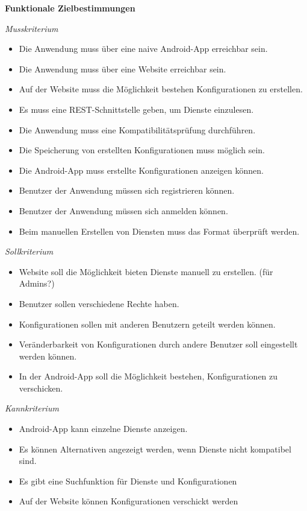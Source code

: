 
\textbf{Funktionale Zielbestimmungen}\newline

\textit{Musskriterium}

\begin{itemize}[leftmargin=4pc]
	\item Die Anwendung muss über eine naive Android-App erreichbar sein.
	\item Die Anwendung muss über eine Website erreichbar sein.
	\item Auf der Website muss die Möglichkeit bestehen Konfigurationen zu erstellen.
	\item Es muss eine REST-Schnittstelle geben, um Dienste einzulesen.
	\item Die Anwendung muss eine Kompatibilitätsprüfung durchführen.
	\item Die Speicherung von erstellten Konfigurationen muss möglich sein.
	\item Die Android-App muss erstellte Konfigurationen anzeigen können.
	\item Benutzer der Anwendung müssen sich registrieren können.
	\item Benutzer der Anwendung müssen sich anmelden können.
	\item Beim manuellen Erstellen von Diensten muss das Format überprüft werden.
\end{itemize}

\textit{Sollkriterium}

\begin{itemize}[leftmargin=4pc]
	\item Website soll die Möglichkeit bieten Dienste manuell zu erstellen. (für Admins?)
	\item Benutzer sollen verschiedene Rechte haben.
	\item Konfigurationen sollen mit anderen Benutzern geteilt werden können.
	\item Veränderbarkeit von Konfigurationen durch andere Benutzer soll eingestellt werden können.
	\item In der Android-App soll die Möglichkeit bestehen, Konfigurationen zu verschicken.
\end{itemize}

\textit{Kannkriterium}

\begin{itemize}[leftmargin=4pc]
	\item Android-App kann einzelne Dienste anzeigen.
	\item Es können Alternativen angezeigt werden, wenn Dienste nicht kompatibel sind.
	\item Es gibt eine Suchfunktion für Dienste und Konfigurationen
	\item Auf der Website können Konfigurationen verschickt werden
\end{itemize}

